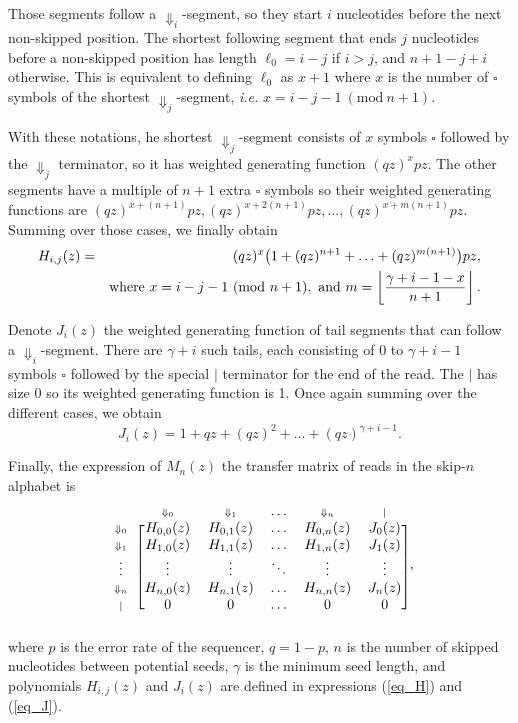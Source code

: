 \documentclass{article}
\newcommand{\Dn}[1]{\scriptstyle{\Downarrow_{#1}}}
\newcommand{\nd}{\scriptstyle{|}}
\newcommand{\modulo}[1]{\ (\mathrm{mod}\ #1)}
\begin{document}
Those segments follow a $\Downarrow_i$-segment, so they start $i$
nucleotides before the next non-skipped position. The shortest following
segment that ends $j$ nucleotides before a non-skipped position has length
$\ell_0 = i-j$ if $i > j$, and $n+1-j+i$ otherwise. This is equivalent to
defining $\ell_0$ as $x+1$ where $x$ is the number of $\square$ symbols of
the shortest $\Downarrow_j$-segment, \textit{i.e.} $x = i-j-1
\modulo{n+1}$.

With these notations, he shortest $\Downarrow_j$-segment consists of $x$
symbols $\square$ followed by the $\Downarrow_j$ terminator, so it has
weighted generating function $(qz)^xpz$. The other segments have a
multiple of $n+1$ extra $\square$ symbols so their weighted
generating functions are $(qz)^{x+(n+1)}pz, (qz)^{x+2(n+1)}pz, \ldots,
(qz)^{x+m(n+1)}pz$. Summing over those cases, we finally obtain
\begin{eqnarray}
\label{eq_H}
H_{i,j}(z) &=& (qz)^x \big( 1 + (qz)^{n+1} +
  \ldots + (qz)^{m(n+1)} \big)pz, \\
\notag
  &\;& \text{where } x = i-j-1 \modulo{n+1},
  \text{ and } m = \left\lfloor
  \frac{\gamma+i-1-x}{n+1} \right\rfloor.
\end{eqnarray}

Denote $J_i(z)$ the weighted generating function of tail segments that can
follow a $\Downarrow_i$-segment. There are $\gamma+i$ such tails, each
consisting of 0 to $\gamma+i-1$ symbols $\square$ followed by the special
$|$ terminator for the end of the read. The $|$ has size 0 so its weighted
generating function is 1. Once again summing over the different cases, we
obtain
\begin{equation}
\label{eq_J}
J_i(z) = 1 + qz + (qz)^2 + \ldots + (qz)^{\gamma+i-1}.
\end{equation}

Finally, the expression of $M_n(z)$ the transfer matrix of reads in the
skip-$n$ alphabet is
\begin{equation}
\label{eq_matrix_Mn}
\begin{blockarray}{cccccc}
   & \Dn{0} & \Dn{1} & \ldots & \Dn{n} & \nd \\
\begin{block}{c[ccccc]}
\Dn{0} & H_{0,0}(z) & H_{0,1}(z) & \ldots & H_{0,n}(z) & J_0(z) \\
\Dn{1} & H_{1,0}(z) & H_{1,1}(z) & \ldots & H_{1,n}(z) & J_1(z) \\
\vdots & \vdots & \vdots & \ddots & \vdots & \vdots \\
\Dn{n} & H_{n,0}(z) & H_{n,1}(z) & \ldots & H_{n,n}(z) & J_n(z) \\
\nd & 0 & 0 & \ldots & 0 & 0 \\
\end{block}
\end{blockarray},
\end{equation}
where $p$ is the error rate of the sequencer, $q=1-p$, $n$ is the number of
skipped nucleotides between potential seeds, $\gamma$ is the minimum seed
length, and polynomials $H_{i,j}(z)$ and $J_i(z)$ are defined in
expressions (\ref{eq_H}) and (\ref{eq_J}).
\end{document}
